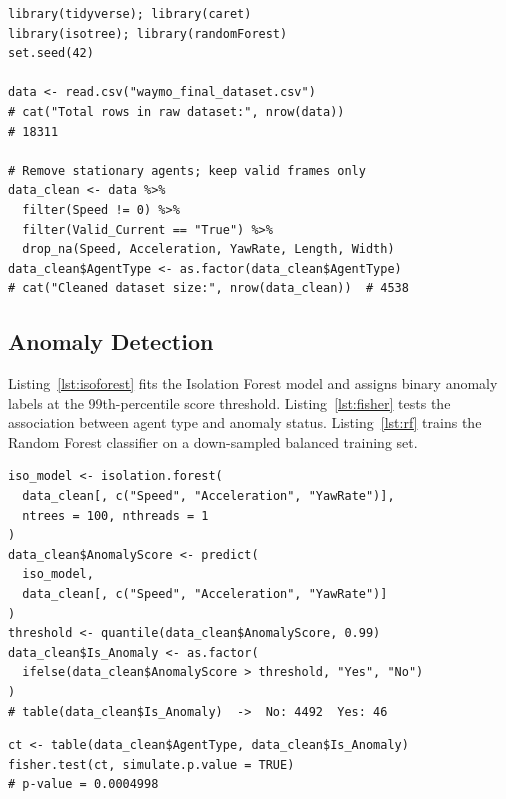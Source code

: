 \documentclass[conference]{IEEEtran}
\begin{document}
\begin{lstlisting}[style=Rstyle, caption={Data loading and preprocessing.}, label={lst:preproc}]
library(tidyverse); library(caret)
library(isotree); library(randomForest)
set.seed(42)

data <- read.csv("waymo_final_dataset.csv")
# cat("Total rows in raw dataset:", nrow(data))
# 18311

# Remove stationary agents; keep valid frames only
data_clean <- data %>%
  filter(Speed != 0) %>%
  filter(Valid_Current == "True") %>%
  drop_na(Speed, Acceleration, YawRate, Length, Width)
data_clean$AgentType <- as.factor(data_clean$AgentType)
# cat("Cleaned dataset size:", nrow(data_clean))  # 4538
\end{lstlisting}

\newpage

\subsection{Anomaly Detection}

Listing~\ref{lst:isoforest} fits the Isolation Forest model and assigns binary anomaly labels at the 99th-percentile score threshold. Listing~\ref{lst:fisher} tests the association between agent type and anomaly status. Listing~\ref{lst:rf} trains the Random Forest classifier on a down-sampled balanced training set.

\begin{lstlisting}[style=Rstyle, caption={Isolation Forest scoring and anomaly labeling.}, label={lst:isoforest}]
iso_model <- isolation.forest(
  data_clean[, c("Speed", "Acceleration", "YawRate")],
  ntrees = 100, nthreads = 1
)
data_clean$AnomalyScore <- predict(
  iso_model,
  data_clean[, c("Speed", "Acceleration", "YawRate")]
)
threshold <- quantile(data_clean$AnomalyScore, 0.99)
data_clean$Is_Anomaly <- as.factor(
  ifelse(data_clean$AnomalyScore > threshold, "Yes", "No")
)
# table(data_clean$Is_Anomaly)  ->  No: 4492  Yes: 46
\end{lstlisting}

\begin{lstlisting}[style=Rstyle, caption={Fisher's Exact Test for agent-type association.}, label={lst:fisher}]
ct <- table(data_clean$AgentType, data_clean$Is_Anomaly)
fisher.test(ct, simulate.p.value = TRUE)
# p-value = 0.0004998
\end{lstlisting}
\end{document}
